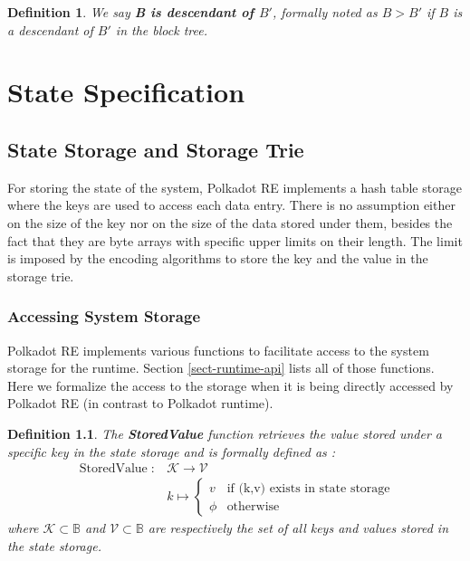 \documentclass{book}
\newcommand{\tmop}[1]{\ensuremath{\operatorname{#1}}}
\newcommand{\tmstrong}[1]{\textbf{#1}}
\newcommand{\tmtextbf}[1]{{\bfseries{#1}}}
\newtheorem{definition}{Definition}
\providecommand{\tmop}[1]{\ensuremath{\mathrm{#1}}}
\providecommand{\tmstrong}[1]{\tmtextbf{#1}}
\providecommand{\tmtextbf}[1]{\tmtextbf{#1}}
\newtheorem{definition}{Definition}
\begin{document}
\begin{definition}
  We say {\tmstrong{B is descendant of $B'$}}, formally noted as {\tmstrong{$B
  > B'$}} if $B$ is a descendant of $B'$ in the block tree.
\end{definition}

\chapter{State Specification}\label{chap-state-spec}

\section{State Storage and Storage Trie}

For storing the state of the system, Polkadot RE implements a hash table
storage where the keys are used to access each data entry. There is no
assumption either on the size of the key nor on the size of the data stored
under them, besides the fact that they are byte arrays with specific upper
limits on their length. The limit is imposed by the encoding algorithms to
store the key and the value in the storage trie.

\subsection{Accessing System Storage }

Polkadot RE implements various functions to facilitate access to the system
storage for the runtime. Section \ref{sect-runtime-api} lists all of those
functions. Here we formalize the access to the storage when it is being
directly accessed by Polkadot RE (in contrast to Polkadot runtime).

\begin{definition}
  \label{defn-stored-value}The {\tmstrong{StoredValue}} function retrieves the
  value stored under a specific key in the state storage and is formally
  defined as :
  \[ \begin{array}{cc}
       \tmop{StoredValue} : & \mathcal{K} \rightarrow \mathcal{V}\\
       & k \mapsto \left\{ \begin{array}{cc}
         v & \text{if (k,v) exists in state storage}\\
         \phi & \tmop{otherwise}
       \end{array} \right.
     \end{array} \]
  where $\mathcal{K} \subset \mathbb{B}$ and $\mathcal{V} \subset \mathbb{B}$
  are respectively the set of all keys and values stored in the state storage.
  
  \ 
\end{definition}
\end{document}

